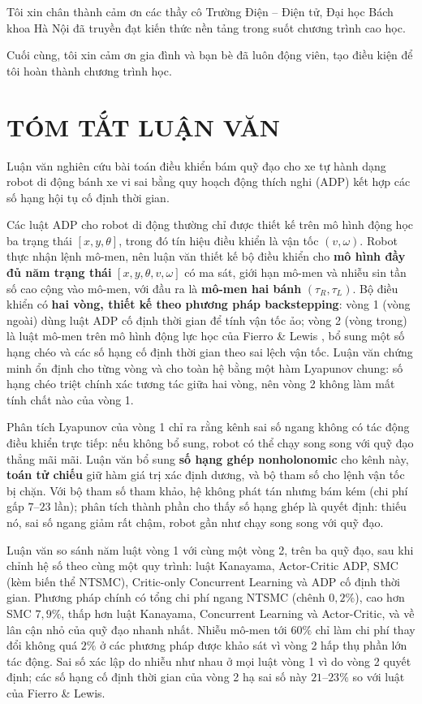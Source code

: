 \documentclass[12pt,a4paper]{article}
\begin{document}
Tôi xin chân thành cảm ơn các thầy cô Trường Điện -- Điện tử, Đại học Bách khoa Hà Nội đã truyền đạt kiến thức nền tảng trong suốt chương trình cao học.

Cuối cùng, tôi xin cảm ơn gia đình và bạn bè đã luôn động viên, tạo điều kiện để tôi hoàn thành chương trình học.

\newpage
\section*{TÓM TẮT LUẬN VĂN}

Luận văn nghiên cứu bài toán điều khiển bám quỹ đạo cho xe tự hành dạng robot di động bánh xe vi sai bằng quy hoạch động thích nghi (ADP) kết hợp các số hạng hội tụ cố định thời gian.

Các luật ADP cho robot di động thường chỉ được thiết kế trên mô hình động học ba trạng thái $[x, y, \theta]$, trong đó tín hiệu điều khiển là vận tốc $(v, \omega)$. Robot thực nhận lệnh mô-men, nên luận văn thiết kế bộ điều khiển cho \textbf{mô hình đầy đủ năm trạng thái} $[x, y, \theta, v, \omega]$ có ma sát, giới hạn mô-men và nhiễu sin tần số cao cộng vào mô-men, với đầu ra là \textbf{mô-men hai bánh} $(\tau_R, \tau_L)$. Bộ điều khiển có \textbf{hai vòng, thiết kế theo phương pháp backstepping}: vòng 1 (vòng ngoài) dùng luật ADP cố định thời gian \cite{Wang2025} để tính vận tốc ảo; vòng 2 (vòng trong) là luật mô-men trên mô hình động lực học của Fierro \& Lewis \cite{Fierro1997}, bổ sung một số hạng chéo và các số hạng cố định thời gian theo sai lệch vận tốc. Luận văn chứng minh ổn định cho từng vòng và cho toàn hệ bằng một hàm Lyapunov chung: số hạng chéo triệt chính xác tương tác giữa hai vòng, nên vòng 2 không làm mất tính chất nào của vòng 1.

Phân tích Lyapunov của vòng 1 chỉ ra rằng kênh sai số ngang không có tác động điều khiển trực tiếp: nếu không bổ sung, robot có thể chạy song song với quỹ đạo thẳng mãi mãi. Luận văn bổ sung \textbf{số hạng ghép nonholonomic} cho kênh này, \textbf{toán tử chiếu} giữ hàm giá trị xác định dương, và bộ tham số cho lệnh vận tốc bị chặn. Với bộ tham số tham khảo, hệ không phát tán nhưng bám kém (chi phí gấp $7$--$23$ lần); phân tích thành phần cho thấy số hạng ghép là quyết định: thiếu nó, sai số ngang giảm rất chậm, robot gần như chạy song song với quỹ đạo.

Luận văn so sánh năm luật vòng 1 với cùng một vòng 2, trên ba quỹ đạo, sau khi chỉnh hệ số theo cùng một quy trình: luật Kanayama, Actor-Critic ADP, SMC (kèm biến thể NTSMC), Critic-only Concurrent Learning và ADP cố định thời gian. Phương pháp chính có tổng chi phí ngang NTSMC (chênh $0{,}2\%$), cao hơn SMC $7{,}9\%$, thấp hơn luật Kanayama, Concurrent Learning và Actor-Critic, và về lân cận nhỏ của quỹ đạo nhanh nhất. Nhiễu mô-men tới $60\%$ chỉ làm chi phí thay đổi không quá $2\%$ ở các phương pháp được khảo sát vì vòng 2 hấp thụ phần lớn tác động. Sai số xác lập do nhiễu như nhau ở mọi luật vòng 1 vì do vòng 2 quyết định; các số hạng cố định thời gian của vòng 2 hạ sai số này $21$--$23\%$ so với luật của Fierro \& Lewis.
\end{document}
